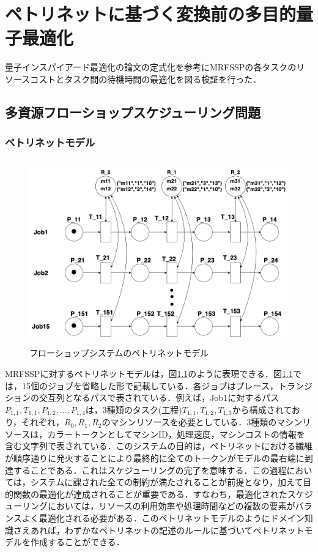 \chapter{ペトリネットに基づく変換前の多目的量子最適化}
\label{chap:poordirection}
量子インスパイアード最適化の論文\cite{shinjo}の定式化を参考にMRFSSPの各タスクのリソースコストとタスク間の待機時間の最適化を図る検証を行った．
\section{多資源フローショップスケジューリング問題}

\subsection{ペトリネットモデル}

\begin{figure}[H]
    \centering
    \includegraphics[width=0.8\linewidth, height=8cm]{./images/fsp.png}
    \caption{フローショップシステムのペトリネットモデル}
    \label{fig:fig1}
\end{figure}

MRFSSPに対するペトリネットモデルは，図\ref{fig:fig1}のように表現できる．図\ref{fig:fig1}では，15個のジョブを省略した形で記載している．各ジョブはプレース，トランジションの交互列となるパスで表されている．例えば，Job1に対するパス$P_{1,1}, T_{1,1}, P_{1,2}, ..., P_{1,4}$は，3種類のタスク(工程)$T_{1,1}, T_{1,2}, T_{1,3}$から構成されており，それぞれ，$R_0, R_1, R_2$のマシンリソースを必要としている．3種類のマシンリソースは，カラートークンとしてマシンID，処理速度，マシンコストの情報を含む文字列で表されている．このシステムの目的は，ペトリネットにおける繊維が順序通りに発火することにより最終的に全てのトークンがモデルの最右端に到達することである．これはスケジューリングの完了を意味する．この過程においては，システムに課された全ての制約が満たされることが前提となり，加えて目的関数の最適化が達成されることが重要である．すなわち，最適化されたスケジューリングにおいては，リソースの利用効率や処理時間などの複数の要素がバランスよく最適化される必要がある．このペトリネットモデルのようにドメイン知識さえあれば，わずかなペトリネットの記述のルールに基づいてペトリネットモデルを作成することができる．

